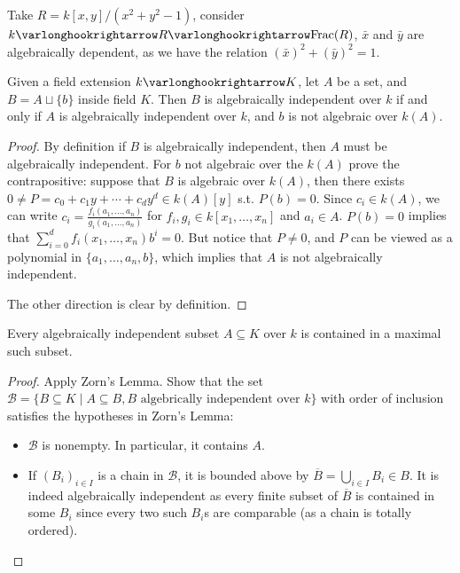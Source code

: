 \begin{example}
    Take $R = k[x, y]/(x^2 + y^2 - 1)$, consider $k \ext R \ext \Frac(R)$, $\bar{x}$ and $\bar{y}$ are algebraically dependent, as we have the relation $(\bar{x})^2 + (\bar{y})^2 = 1$.
\end{example}

\begin{proposition}\label{prop: transitivity of alg. indep.}
    Given a field extension $k \ext K$, let $A$ be a set, and $B = A \sqcup \{b\}$ inside field $K$. Then $B$ is algebraically independent over $k$ if and only if $A$ is algebraically independent over $k$, and $b$ is not algebraic over $k(A)$.
\end{proposition}

\begin{proof}
    By definition if $B$ is algebraically independent, then $A$ must be algebraically independent. For $b$ not algebraic over the $k(A)$ prove the contrapositive: suppose that $B$ is algebraic over $k(A)$, then there exists $0 \neq P = c_0 + c_1 y + \cdots + c_d y^d \in k(A)[y]$ s.t. $P(b) = 0$. Since $c_i \in k(A)$, we can write $c_i = \frac{f_i (a_1, \dots, a_n)}{g_i (a_1, \dots, a_n)}$ for $f_i, g_i \in k[x_1, \dots, x_n]$ and $a_i \in A$. $P(b) = 0$ implies that $\sum_{i = 0}^d f_i (x_1, \dots, x_n) b^i = 0$. But notice that $P \neq 0$, and $P$ can be viewed as a polynomial in $\{a_1, \dots, a_n, b\}$, which implies that $A$ is not algebraically independent. 

    The other direction is clear by definition.
\end{proof}

\begin{proposition}\label{prop: existence of max alg. indep. subset}
    Every algebraically independent subset $A \subseteq K$ over $k$ is contained in a maximal such subset.
\end{proposition}

\begin{proof}
    Apply Zorn's Lemma. Show that the set $\mathcal{B} = \{B \subseteq K \mid A \subseteq B, \text{$B$ algebrically independent over $k$}\}$ with order of inclusion satisfies the hypotheses in Zorn's Lemma:
    \begin{itemize}
        \item $\mathcal{B}$ is nonempty. In particular, it contains $A$.
        \item If $(B_i)_{i \in I}$ is a chain in $\mathcal{B}$, it is bounded above by $\overline{B} = \bigcup_{i \in I} B_i \in B$. It is indeed algebraically independent as every finite subset of $\overline{B}$ is contained in some $B_i$ since every two such $B_i$s are comparable (as a chain is totally ordered). 
    \end{itemize}
\end{proof}

